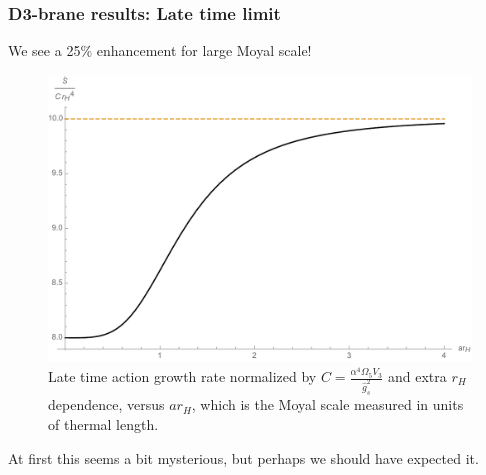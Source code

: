 \documentclass[10pt]{beamer}
\begin{document}
\begin{frame}
\frametitle{D3-brane results: Late time limit}

We see a 25\% enhancement for large Moyal scale!

\begin{figure}[htbp]
    \begin{center}
        \includegraphics[scale=0.3]{LateTime}
    \end{center}
    \caption{Late time action growth rate normalized by $C=\frac{\alpha^4 \Omega_5 V_3}{\hat{g}_s^2}$ and extra $r_H$ dependence, versus $a r_H$, which is the Moyal scale measured in units of thermal length.} 
    \label{fig:LateTime}
\end{figure}

At first this seems a bit mysterious, but perhaps we should have expected it.

\end{frame}
\end{document}
